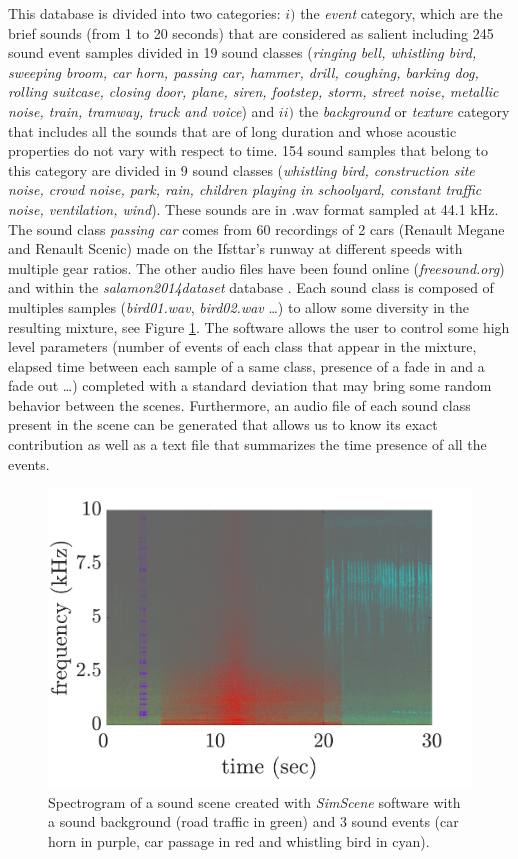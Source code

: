 \documentclass[twocolumn]{svjour3}          %
\begin{document}
This database is divided into two categories: $i)$ the \textit{event} category, which are the brief sounds (from 1 to 20 seconds) that are considered as salient including 245 sound event samples divided in 19 sound classes (\textit{ringing bell, whistling bird, sweeping broom, car horn, passing car, hammer, drill, coughing, barking dog, rolling suitcase, closing door, plane, siren, footstep, storm, street noise, metallic noise, train, tramway, truck and voice}) and $ii)$ the \textit{background} or \textit{texture} category that includes all the sounds that are of long duration and whose acoustic properties do not vary with respect to time. 154 sound samples that belong to this category are divided in 9 sound classes (\textit{whistling bird, construction site noise, crowd noise, park, rain, children playing in schoolyard, constant traffic noise, ventilation, wind}). These sounds are in .wav format sampled at 44.1 kHz. The sound class \textit{passing car} comes from 60 recordings of 2 cars (Renault Megane and Renault Scenic) made on the Ifsttar's runway at different speeds with multiple gear ratios. The other audio files have been found online (\textit{freesound.org}) and within the \textit{salamon2014dataset} database \cite{salamon_dataset_nodate}. Each sound class is composed of multiples samples (\textit{bird01.wav}, \textit{bird02.wav} \dots) to allow some diversity in the resulting mixture, see Figure \ref{fig:example_simScene}. The software allows the user to control some high level parameters (number of events of each class that appear in the mixture, elapsed time between each sample of a same class, presence of a fade in and a fade out \dots) completed with a standard deviation that may bring some random behavior between the scenes. Furthermore, an audio file of each sound class present in the scene can be generated that allows us to know its exact contribution as well as a text file that summarizes the time presence of all the events.\\


\begin{figure}[t]
    \centering
       \includegraphics[width=.9\linewidth]{./figures/exampleSimScene}
    \caption{Spectrogram of a sound scene created with \textit{SimScene} software with a sound background (road traffic in green) and 3 sound events (car horn in purple, car passage in red and whistling bird in cyan).}
    \label{fig:example_simScene}
\end{figure}
\end{document}
